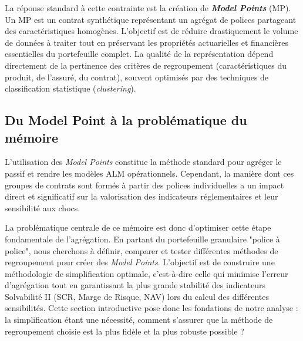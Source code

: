 \bigskip

La réponse standard à cette contrainte est la création de \textbf{\textit{Model Points}} (MP). Un MP est un contrat synthétique représentant un agrégat de polices partageant des caractéristiques homogènes. L'objectif est de réduire drastiquement le volume de données à traiter tout en préservant les propriétés actuarielles et financières essentielles du portefeuille complet. La qualité de la représentation dépend directement de la pertinence des critères de regroupement (caractéristiques du produit, de l'assuré, du contrat), souvent optimisés par des techniques de classification statistique (\textit{clustering}).

\subsection{Du Model Point à la problématique du mémoire}

L'utilisation des \textit{Model Points} constitue la méthode standard pour agréger le passif et rendre les modèles ALM opérationnels. Cependant, la manière dont ces groupes de contrats sont formés à partir des polices individuelles a un impact direct et significatif sur la valorisation des indicateurs réglementaires et leur sensibilité aux chocs.

\bigskip

La problématique centrale de ce mémoire est donc d'optimiser cette étape fondamentale de l'agrégation. En partant du portefeuille granulaire "police à police", nous cherchons à définir, comparer et tester différentes méthodes de regroupement pour créer des \textit{Model Points}. L'objectif est de construire une méthodologie de simplification optimale, c'est-à-dire celle qui minimise l'erreur d'agrégation tout en garantissant la plus grande stabilité des indicateurs Solvabilité II (SCR, Marge de Risque, NAV) lors du calcul des différentes sensibilités. Cette section introductive pose donc les fondations de notre analyse : la simplification étant une nécessité, comment s'assurer que la méthode de regroupement choisie est la plus fidèle et la plus robuste possible ?
